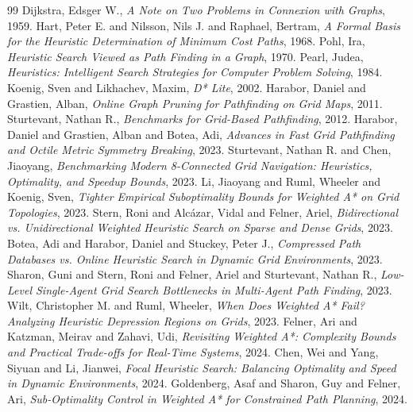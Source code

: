 \documentclass[conference]{IEEEtran}
\begin{document}
\begin{thebibliography}{99}
   Dijkstra, Edsger W., \textit{A Note on Two Problems in Connexion with Graphs}, 1959.
   Hart, Peter E. and Nilsson, Nils J. and Raphael, Bertram, \textit{A Formal Basis for the Heuristic Determination of Minimum Cost Paths}, 1968.
   Pohl, Ira, \textit{Heuristic Search Viewed as Path Finding in a Graph}, 1970.
   Pearl, Judea, \textit{Heuristics: Intelligent Search Strategies for Computer Problem Solving}, 1984.
   Koenig, Sven and Likhachev, Maxim, \textit{D* Lite}, 2002.
   Harabor, Daniel and Grastien, Alban, \textit{Online Graph Pruning for Pathfinding on Grid Maps}, 2011.
   Sturtevant, Nathan R., \textit{Benchmarks for Grid-Based Pathfinding}, 2012.
   Harabor, Daniel and Grastien, Alban and Botea, Adi, \textit{Advances in Fast Grid Pathfinding and Octile Metric Symmetry Breaking}, 2023.
   Sturtevant, Nathan R. and Chen, Jiaoyang, \textit{Benchmarking Modern 8-Connected Grid Navigation: Heuristics, Optimality, and Speedup Bounds}, 2023.
   Li, Jiaoyang and Ruml, Wheeler and Koenig, Sven, \textit{Tighter Empirical Suboptimality Bounds for Weighted A* on Grid Topologies}, 2023.
   Stern, Roni and Alc{\'a}zar, Vidal and Felner, Ariel, \textit{Bidirectional vs. Unidirectional Weighted Heuristic Search on Sparse and Dense Grids}, 2023.
   Botea, Adi and Harabor, Daniel and Stuckey, Peter J., \textit{Compressed Path Databases vs. Online Heuristic Search in Dynamic Grid Environments}, 2023.
   Sharon, Guni and Stern, Roni and Felner, Ariel and Sturtevant, Nathan R., \textit{Low-Level Single-Agent Grid Search Bottlenecks in Multi-Agent Path Finding}, 2023.
   Wilt, Christopher M. and Ruml, Wheeler, \textit{When Does Weighted A* Fail? Analyzing Heuristic Depression Regions on Grids}, 2023.
   Felner, Ari and Katzman, Meirav and Zahavi, Udi, \textit{Revisiting Weighted A*: Complexity Bounds and Practical Trade-offs for Real-Time Systems}, 2024.
   Chen, Wei and Yang, Siyuan and Li, Jianwei, \textit{Focal Heuristic Search: Balancing Optimality and Speed in Dynamic Environments}, 2024.
   Goldenberg, Asaf and Sharon, Guy and Felner, Ari, \textit{Sub-Optimality Control in Weighted A* for Constrained Path Planning}, 2024.

\end{thebibliography}
\end{document}
